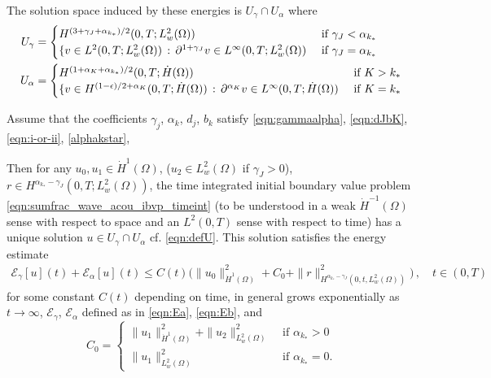 The solution space induced by these energies is $U_\gamma\cap U_\alpha$ where
\begin{equation}\label{eqn:defU}
\begin{aligned}
U_\gamma&=\begin{cases}
H^{(3+\gamma_J+\alpha_{k_*})/2}(0,T;L^2_w(\Omega))&\mbox{ if }\gamma_J<\alpha_{k_*}\\
\{v\in L^2(0,T;L^2_w(\Omega))\, : \, \partial^{1+\gamma_J} v\in L^\infty(0,T;L^2_w(\Omega))&\mbox{ if }\gamma_J=\alpha_{k_*}
\end{cases}
\\
U_\alpha&=\begin{cases}
H^{(1+\alpha_K+\alpha_{k_*})/2}(0,T;\dot{H}(\Omega))&\mbox{ if }K>k_*\\
\{v\in {H^{(1-\epsilon)/2+\alpha_K}(0,T;\dot{H}(\Omega))}\, : \, \partial^{\alpha_K} v\in L^\infty(0,T;\dot{H}(\Omega))&\mbox{ if }K=k_*
\end{cases}
\end{aligned}
\end{equation}

\begin{theorem}\label{thm:sumfrac}
Assume that the coefficients $\gamma_j$, $\alpha_k$, $d_j$, $b_k$ satisfy \eqref{eqn:gammaalpha}, \eqref{eqn:dJbK}, \eqref{eqn:i-or-ii}, \eqref{alphakstar}, 


Then for any $u_0,u_1\in \dot{H}^1(\Omega)$, ($u_2\in L^2_w(\Omega)$ if $\gamma_J>0$), $r\in H^{\alpha_{k_*}-\gamma_J}(0,T;L^2_w(\Omega))$, the time integrated initial boundary value problem
\eqref{eqn:sumfrac_wave_acou_ibvp_timeint} (to be understood in a weak $\dot{H}^{-1}(\Omega)$ sense with respect to space and an $L^2(0,T)$ sense with respect to time) has a unique solution $u\in U_\gamma\cap U_\alpha$ cf. \eqref{eqn:defU}.
This solution satisfies the energy estimate
\begin{equation}\label{eqn:enest_sumfrac}
\begin{aligned}
\mathcal{E}_\gamma[u](t)+\mathcal{E}_\alpha[u](t)
\leq 
C(t) \bigl(\|u_0\|_{\dot{H}^1(\Omega)}^2 + C_0+\|r\|_{H^{\alpha_{k_*}-\gamma_J}(0,t,L^2_w(\Omega))}^2\bigr)\,, \quad t\in(0,T)
\end{aligned}
\end{equation}
for some constant $C(t)$ depending on time,  in general grows exponentially as
$t\to\infty$, $\mathcal{E}_\gamma$, $\mathcal{E}_\alpha$ defined as in \eqref{eqn:Ea}, \eqref{eqn:Eb}, and 
\begin{equation}\label{eqn:C0}
C_0 = \begin{cases} 
\|u_1\|_{\dot{H}^1(\Omega)}^2 + \|u_2\|_{L^2_w(\Omega)}^2 &\mbox{ if }\alpha_{k_*}>0\\ 
\|u_1\|_{L^2_w(\Omega)}^2 &\mbox{ if }\alpha_{k_*}=0.
\end{cases} 
\end{equation}
\end{theorem}

